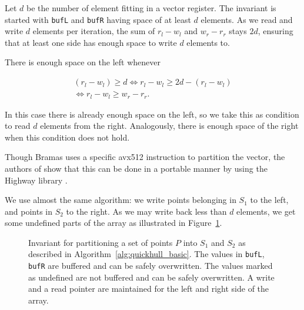 Let $d$ be the number of element fitting in a vector register. The invariant
is started with \texttt{bufL} and \texttt{bufR} having space of at least
$d$ elements. As we read and write $d$ elements per iteration, the sum
of $r_l - w_l$ and $w_r - r_r$ stays $2d$, ensuring that at least one side
has enough space to write $d$ elements to.

There is enough space on the left whenever

\begin{multline}
(r_l - w_l) \geq d \iff r_l - w_l \geq 2d - (r_l - w_l) \\
\iff r_l - w_l \geq w_r - r_r.
\label{eq:bramas}
\end{multline}

In this case there is already enough space on the left, so we take this as
condition to read $d$ elements from the right. Analogously, there is enough
space of the right when this condition does not hold.

Though Bramas uses a specific avx512 instruction to partition the vector,
the authors of \cite{} show that this can be done in a portable manner by using
the Highway library \cite{}.

We use almost the same algorithm: we write points belonging in $S_1$ to the
left, and points in $S_2$ to the right. As we may write back less than
$d$ elements, we get some undefined parts of the array as illustrated in
Figure~\ref{fig:invariant_qhull}.

\begin{figure}[ht]
    \caption{Invariant for partitioning a set of points $P$ into 
             $S_1$ and $S_2$ as described in 
             Algorithm~\ref{alg:quickhull_basic}. 
             The values in \texttt{bufL}, \texttt{bufR}
             are buffered and can be safely overwritten. The values marked
             as undefined are not buffered and can be safely overwritten.
             A write and a read pointer are maintained for
             the left and right side of the array.}
    \label{fig:invariant_qhull}
\end{figure}

